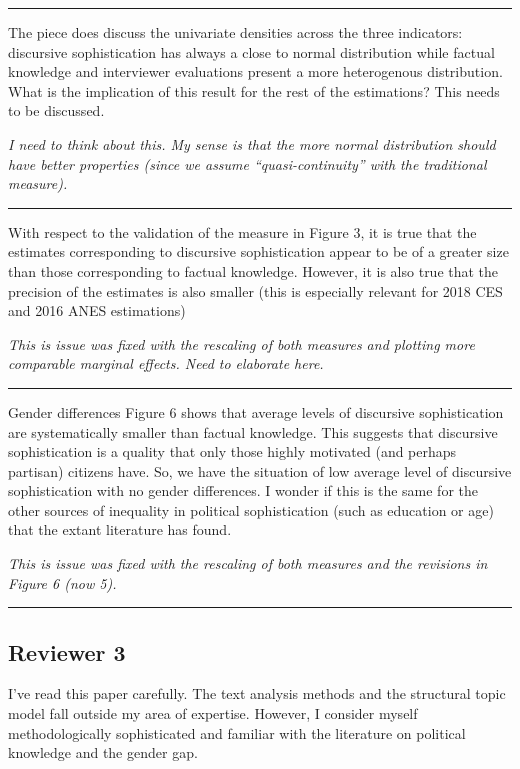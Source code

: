 \rule{\linewidth}{.01cm}

The piece does discuss the univariate densities across the three indicators: discursive sophistication has always a close to normal distribution while factual knowledge and interviewer evaluations present a more heterogenous distribution. What is the implication of this result for the rest of the estimations? This needs to be discussed.

\textit{I need to think about this. My sense is that the more normal distribution should have better properties (since we assume ``quasi-continuity'' with the traditional measure).}

\rule{\linewidth}{.01cm}

With respect to the validation of the measure in Figure 3, it is true that the estimates corresponding to discursive sophistication appear to be of a greater size than those corresponding to factual knowledge. However, it is also true that the precision of the estimates is also smaller (this is especially relevant for 2018 CES and 2016 ANES estimations)

\textit{This is issue was fixed with the rescaling of both measures and plotting more comparable marginal effects. Need to elaborate here.}

\rule{\linewidth}{.01cm}

Gender differences Figure 6 shows that average levels of discursive sophistication are systematically smaller than factual knowledge. This suggests that discursive sophistication is a quality that only those highly motivated (and perhaps partisan) citizens have. So, we have the situation of low average level of discursive sophistication with no gender differences. I wonder if this is the same for the other sources of inequality in political sophistication (such as education or age) that the extant literature has found.

\textit{This is issue was fixed with the rescaling of both measures and the revisions in Figure 6 (now 5).}

\rule{\linewidth}{.01cm}


\subsection*{Reviewer 3}

I’ve read this paper carefully. The text analysis methods and the structural topic model fall outside my area of expertise. However, I consider myself methodologically sophisticated and familiar with the literature on political knowledge and the gender gap.

